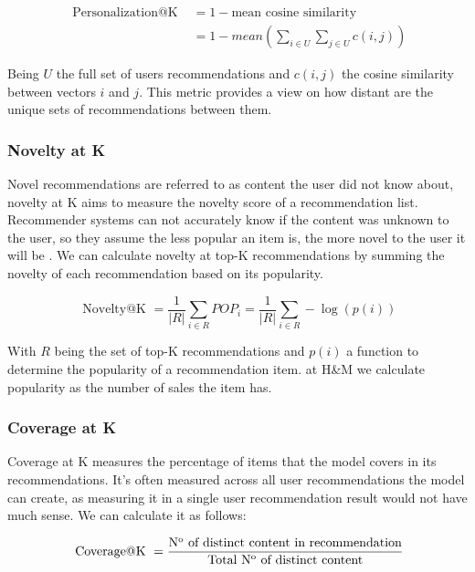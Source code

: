 \documentclass{kththesis}
\newcommand*{\Num}{N\textsuperscript{o}\xspace}
\begin{document}
\begin{equation}
\begin{aligned}
\text { Personalization@K } &= 1 - \text{mean cosine similarity} \\
&= 1 - mean(\sum_{i \in U}\sum_{j \in U}c(i,j))
\end{aligned}
\end{equation}

Being $U$ the full set of users recommendations and $c(i,j)$ the cosine similarity between vectors $i$ and $j$. This metric provides a view on how distant are the unique sets of recommendations between them.


\subsubsection{Novelty at K}
Novel recommendations are referred to as content the user did not know about\cite{noveltyintro}, novelty at K aims to measure the novelty score of a recommendation list. Recommender systems can not accurately know if the content was unknown to the user, so they assume the less popular an item is, the more novel to the user it will be \cite{noveltyassumption}. We can calculate novelty at top-K recommendations by summing the novelty of each recommendation based on its popularity. 


\begin{equation}
\text { Novelty@K }=\frac{1}{|R|} \sum_{i \in R} P O P_{i}=\frac{1}{|R|} \sum_{i \in R}-\log (p(i))
\end{equation}

With $R$ being the set of top-K recommendations and $p(i)$ a function to determine the popularity of a recommendation item. at H\&M we calculate popularity as the number of sales the item has.

\subsubsection{Coverage at K}
Coverage at K measures the percentage of items that the model covers in its recommendations. It's often measured across all user recommendations the model can create, as measuring it in a single user recommendation result would not have much sense. We can calculate it as follows:

\begin{equation}
\text { Coverage@K }= \frac{\text{\Num  of distinct content in recommendation}}{\text{Total \Num  of distinct content}}
\end{equation}
\end{document}
